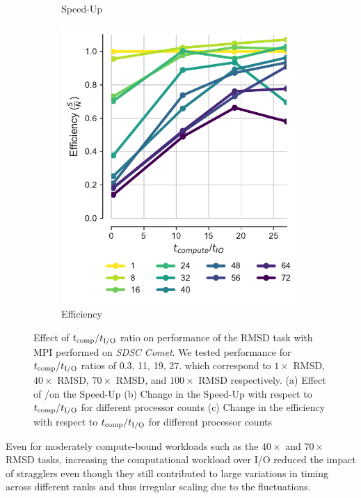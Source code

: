 \begin{figure}[ht!]
\begin{subfigure}{.3\textwidth}
  \caption{Speed-Up}
  \label{fig:S2_tcomp_tIO_effect}
\end{subfigure}
\hfill
\begin{subfigure}{.3\textwidth}
  \includegraphics[width=\linewidth]{figures/Compute_to_IO_ratio_on_performance_2d_3_v17.pdf}
  \caption{Efficiency}
  \label{fig:E_tcomp_tIO_effect}
\end{subfigure}
%
\caption{Effect of ${t}_{\text{comp}}/{t}_{\text{I/O}}$ ratio on performance of the RMSD task with MPI performed on \emph{SDSC Comet}. We tested performance for ${t}_{\text{comp}}/{t}_{\text{I/O}}$ ratios of 0.3, 11, 19, 27.
which correspond to $1\times$ RMSD, $40\times$ RMSD, $70\times$ RMSD, and $100\times$ RMSD respectively. (a) Effect of \tcomp/\tIO on the Speed-Up
(b) Change in the Speed-Up with respect to ${t}_{\text{comp}}/{t}_{\text{I/O}}$ for different processor counts (c) Change in the efficiency with respect to ${t}_{\text{comp}}/{t}_{\text{I/O}}$ for different processor counts}
\label{fig:tcomp_tIO_effect}
\end{figure}

Even for moderately compute-bound workloads such as the $40\times$ and $70\times$ RMSD tasks, increasing the computational workload over I/O reduced the impact of stragglers even though they still contributed to large variations in timing across different ranks and thus irregular scaling due to the fluctuations.

